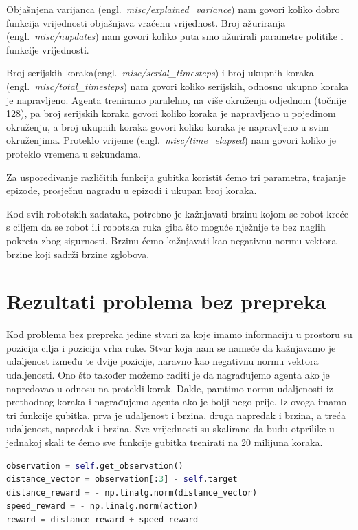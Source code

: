 \documentclass[times,utf8,diplomski]{fer}
\begin{document}
Objašnjena varijanca (engl.~\emph{misc/explained\_variance}) nam govori koliko dobro funkcija vrijednosti objašnjava vraćenu vrijednost. Broj ažuriranja (engl.~\emph{misc/nupdates}) nam govori koliko puta smo ažurirali parametre politike i funkcije vrijednosti. 

Broj serijskih koraka(engl.~\emph{misc/serial\_timesteps}) i broj ukupnih koraka (engl.~\emph{misc/total\_timesteps}) nam govori koliko serijskih, odnosno ukupno koraka je napravljeno. Agenta treniramo paralelno, na više okruženja odjednom (točnije 128), pa broj serijskih koraka govori koliko koraka je napravljeno u pojedinom okruženju, a broj ukupnih koraka govori koliko koraka je napravljeno u svim okruženjima. Proteklo vrijeme (engl.~\emph{misc/time\_elapsed}) nam govori koliko je proteklo vremena u sekundama.

Za uspoređivanje različitih funkcija gubitka koristit ćemo tri parametra, trajanje epizode, prosječnu nagradu u epizodi i ukupan broj koraka.


Kod svih robotskih zadataka, potrebno je kažnjavati brzinu kojom se robot kreće s ciljem da se robot ili robotska ruka giba što moguće nježnije te bez naglih pokreta zbog sigurnosti. Brzinu ćemo kažnjavati kao negativnu normu vektora brzine koji sadrži brzine zglobova. 

\section{Rezultati problema bez prepreka}

Kod problema bez prepreka jedine stvari za koje imamo informaciju u prostoru su pozicija cilja i pozicija vrha ruke. Stvar koja nam se nameće da kažnjavamo je udaljenost između te dvije pozicije, naravno kao negativnu normu vektora udaljenosti. Ono što također možemo raditi je da nagrađujemo agenta ako je napredovao u odnosu na protekli korak. Dakle, pamtimo normu udaljenosti iz prethodnog koraka i nagrađujemo agenta ako je bolji nego prije. Iz ovoga imamo tri funkcije gubitka, prva je udaljenost i brzina, druga napredak i brzina, a treća udaljenost, napredak i brzina. Sve vrijednosti su skalirane da budu otprilike u jednakoj skali te ćemo sve funkcije gubitka trenirati na 20 milijuna koraka.

\begin{lstlisting}[caption={Kod za udaljenost i brzinu},language=Python]
observation = self.get_observation()
distance_vector = observation[:3] - self.target
distance_reward = - np.linalg.norm(distance_vector)
speed_reward = - np.linalg.norm(action)
reward = distance_reward + speed_reward
\end{lstlisting}
\end{document}
